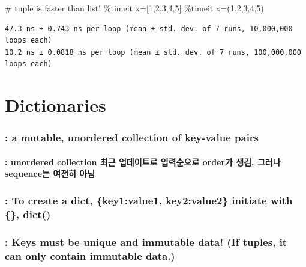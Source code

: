 \documentclass[
  letterpaper,
  DIV=11,
  numbers=noendperiod]{scrreprt}
\let\oldparagraph\paragraph
\renewcommand{\paragraph}[1]{\oldparagraph{#1}\mbox{}}
\newenvironment{Shaded}{\begin{snugshade}}{\end{snugshade}}
\newcommand{\CommentTok}[1]{\textcolor[rgb]{0.37,0.37,0.37}{#1}}
\newcommand{\DecValTok}[1]{\textcolor[rgb]{0.68,0.00,0.00}{#1}}
\newcommand{\NormalTok}[1]{\textcolor[rgb]{0.00,0.23,0.31}{#1}}
\newcommand{\OperatorTok}[1]{\textcolor[rgb]{0.37,0.37,0.37}{#1}}
\begin{document}
\begin{Shaded}
\begin{Highlighting}[]
\CommentTok{\# tuple is faster than list!}
\OperatorTok{\%}\NormalTok{timeit x}\OperatorTok{=}\NormalTok{[}\DecValTok{1}\NormalTok{,}\DecValTok{2}\NormalTok{,}\DecValTok{3}\NormalTok{,}\DecValTok{4}\NormalTok{,}\DecValTok{5}\NormalTok{]}
\OperatorTok{\%}\NormalTok{timeit x}\OperatorTok{=}\NormalTok{(}\DecValTok{1}\NormalTok{,}\DecValTok{2}\NormalTok{,}\DecValTok{3}\NormalTok{,}\DecValTok{4}\NormalTok{,}\DecValTok{5}\NormalTok{)}
\end{Highlighting}
\end{Shaded}

\begin{verbatim}
47.3 ns ± 0.743 ns per loop (mean ± std. dev. of 7 runs, 10,000,000 loops each)
10.2 ns ± 0.0818 ns per loop (mean ± std. dev. of 7 runs, 100,000,000 loops each)
\end{verbatim}

\section{Dictionaries}\label{dictionaries}

\subsubsection{: a mutable, unordered collection of key-value
pairs}\label{a-mutable-unordered-collection-of-key-value-pairs}

\paragraph{: unordered collection 최근 업데이트로 입력순으로 order가
생김. 그러나 sequence는 여전히
아님}\label{unordered-collection-uxcd5cuxadfc-uxc5c5uxb370uxc774uxd2b8uxb85c-uxc785uxb825uxc21cuxc73cuxb85c-orderuxac00-uxc0dduxae40.-uxadf8uxb7ecuxb098-sequenceuxb294-uxc5ecuxc804uxd788-uxc544uxb2d8}

\subsubsection{: To create a dict, \{key1:value1, key2:value2\} initiate
with \{\},
dict()}\label{to-create-a-dict-key1value1-key2value2-initiate-with-dict}

\subsubsection{: Keys must be unique and immutable data! (If tuples, it
can only contain immutable
data.)}\label{keys-must-be-unique-and-immutable-data-if-tuples-it-can-only-contain-immutable-data.}
\end{document}

